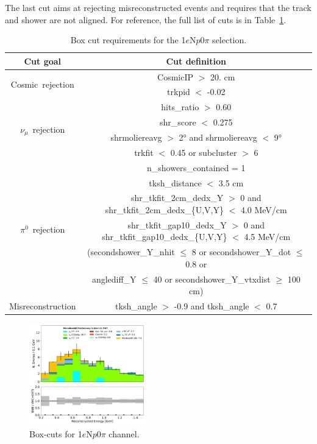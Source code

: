 \documentclass[a4paper]{article}
\newcommand{\npsel}{1$e$N$p$0$\pi$ }
\begin{document}
The last cut aims at rejecting misreconstructed events and requires that the track and shower are not aligned. For reference, the full list of cuts is in Table~\ref{tab:1eNp:boxcut}.

\begin{table}[h!]
\centering
\setlength{\tabcolsep}{10pt}
\renewcommand{\arraystretch}{1.25}
 \begin{tabular}{| c | c |} 
 \hline
 Cut goal & Cut definition \\
 \hline\hline
\multirow{2}{*}{Cosmic~rejection} & CosmicIP $>$ 20. \si{\cm} \\
& trkpid $<$ -0.02 \\
 \hline
\multirow{4}{*}{$\nu_\mu$~rejection} & hits\_ratio $>$ 0.60 \\
 & shr\_score $<$ 0.275 \\
& shrmoliereavg $>$ 2\si{\degree} and shrmoliereavg $<$ 9\si{\degree} \\
& trkfit $<$ 0.45 or subcluster $>$ 6 \\
 \hline
\multirow{6}{*}{$\pi^0$~rejection} & n\_showers\_contained = 1 \\
& tksh\_distance $<$ 3.5 \si{\cm} \\
& shr\_tkfit\_2cm\_dedx\_Y $>$ 0 and shr\_tkfit\_2cm\_dedx\_\{U,V,Y\} $<$ 4.0 \si{\MeV}/\si{\cm} \\
& shr\_tkfit\_gap10\_dedx\_Y $>$ 0 and shr\_tkfit\_gap10\_dedx\_\{U,V,Y\} $<$ 4.5 \si{\MeV}/\si{\cm} \\
& (secondshower\_Y\_nhit $\leq$ 8 or secondshower\_Y\_dot $\leq$ 0.8 or \\
&  anglediff\_Y $\leq$ 40 or secondshower\_Y\_vtxdist $\geq$ 100 \si{\cm}) \\
 \hline
Misreconstruction & tksh\_angle $>$ -0.9 and tksh\_angle $<$ 0.7 \\
 \hline
 \end{tabular}
 \caption{\label{tab:1eNp:boxcut} Box cut requirements for the \npsel selection.}
\end{table}

\begin{figure}[ht]
\begin{center}
\includegraphics[width=0.45\textwidth]{1eNp/reco_e_01162020_box_RUN1.pdf}
\caption{\label{fig:1eNp:box:RUN1}Box-cuts for \npsel channel.}
\end{center}
\end{figure}
\end{document}
